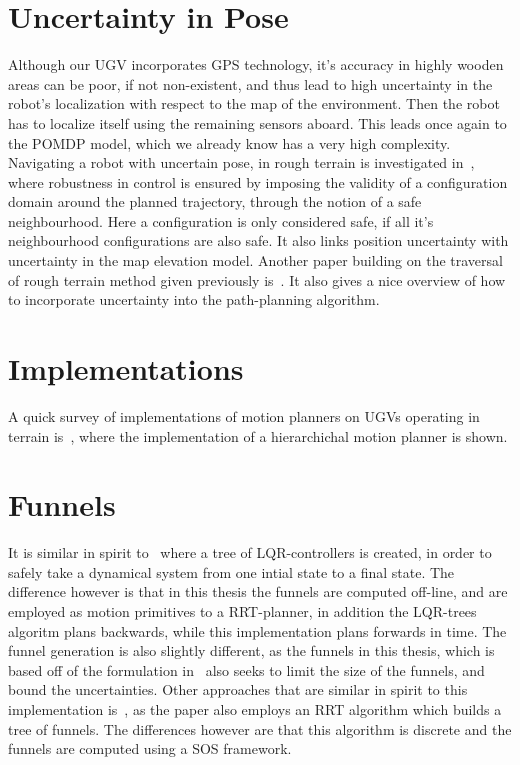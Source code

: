 \section{Uncertainty in Pose}
Although our UGV incorporates GPS technology, it's accuracy in highly wooden
areas can be poor, if not non-existent, and thus lead to high uncertainty in the
robot's localization with respect to the map of the environment. Then the robot
has to localize itself using the remaining sensors aboard. This leads once again
to the POMDP model, which we already know has a very high complexity. Navigating
a robot with uncertain pose, in rough terrain is investigated
in~\cite{haitMotionPlanningRough1996}, where robustness in control is ensured by
imposing the validity of a configuration domain around the planned trajectory,
through the notion of a safe neighbourhood. Here a configuration is only
considered safe, if all it's neighbourhood configurations are also safe. It also
links position uncertainty with uncertainty in the map elevation model. Another
paper building on the traversal of rough terrain method given previously
is~\cite{iagnemmaRapidPhysicsbasedRoughterrain1999}. It also gives a nice
overview of how to incorporate uncertainty into the path-planning algorithm.


\section{Implementations}
A quick survey of implementations of motion planners on UGVs operating in
terrain is~\cite{kellyReliableRoadAutonomous2006}, where the implementation of a
hierarchichal motion planner is shown.

\section{Funnels}

It is similar in spirit to~\cite{tedrakeLQRtreesFeedbackMotion2009} where a tree
of \ac{LQR}-controllers is created, in order to safely take a dynamical system
from one intial state to a final state. The difference however is that in this
thesis the funnels are computed off-line, and are employed as motion primitives
to a \ac{RRT}-planner, in addition the \ac{LQR}-trees algoritm plans backwards,
while this implementation plans forwards in time. The funnel generation is also
slightly different, as the funnels in this thesis, which is based off of the
formulation in~\cite{majumdarFunnelLibrariesRealtime2017} also seeks to limit
the size of the funnels, and bound the uncertainties. Other approaches that are
similar in spirit to this implementation
is~\cite{lenySequentialCompositionRobust2012}, as the paper also employs an
\ac{RRT} algorithm which builds a tree of funnels. The differences however are
that this algorithm is discrete and the funnels are computed using a \ac{SOS}
framework.
